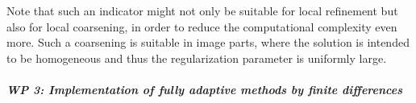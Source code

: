 \documentclass[enabledeprecatedfontcommands,cleardoublepage=empty,headsepline,twoside,11pt,DIV=15,BCOR=12mm,final]{scrartcl}
\begin{document}
Note that such an indicator might not only be suitable for local refinement but also for local coarsening, in order to reduce the computational complexity even more. Such a coarsening is suitable in image parts, where the solution is intended to be homogeneous and thus the regularization parameter is uniformly large.
 
 
 
 
 


 
 \subparagraph{WP 3: Implementation of fully adaptive methods by finite differences}
 
\end{document}
